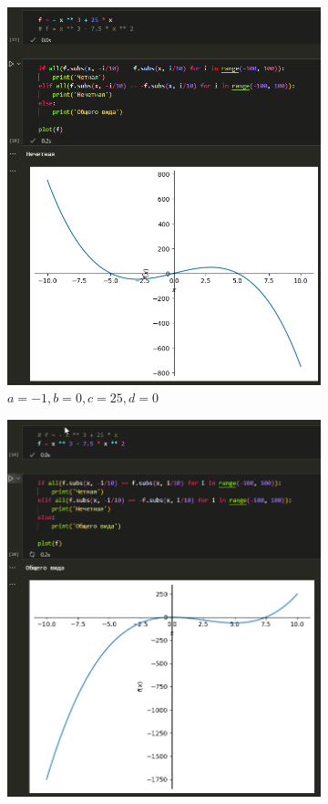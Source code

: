 \documentclass[14pt,a4paper]{extarticle}
\begin{document}
\begin{figure}[h!]
    \centering
    \begin{subfigure}{.5\textwidth}
        \centering
        \includegraphics[width=0.9\linewidth]{figures//inftech//lab1/1.2-cb1.png}
        \caption{$a=-1,b=0,c=25,d=0$}
        \label{fig:1.2-cb1}
    \end{subfigure}%
    \begin{subfigure}{.5\textwidth}
        \centering
        \includegraphics[width=0.9\linewidth]{figures//inftech//lab1/1.2-cb2.png}

\end{subfigure}
\end{figure}
\end{document}
